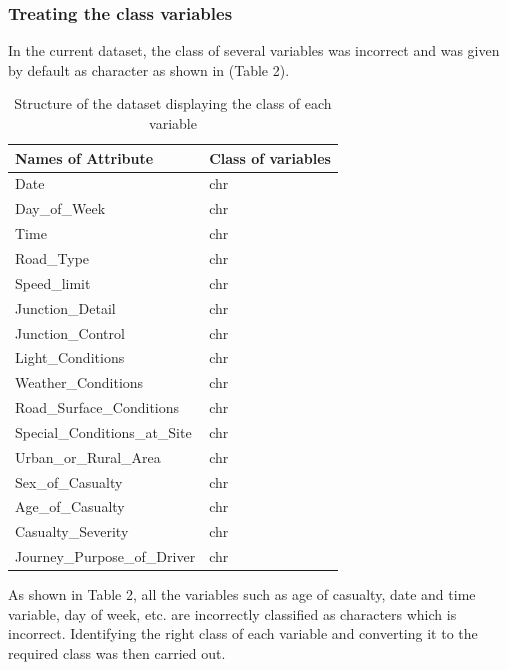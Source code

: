 \documentclass[
  a4paper,
]{article}
\begin{document}
\hypertarget{treating-the-class-variables}{%
\subsubsection{Treating the class
variables}\label{treating-the-class-variables}}

In the current dataset, the class of several variables was incorrect and
was given by default as character as shown in (Table 2).

\begin{table}[h]
\caption{Structure of the dataset displaying the class of each variable}
\bigskip
\centering
\begin{tabular}{l l}
\hline\hline
Names of Attribute & Class of variables\\ [0.75ex]
\hline
Date & chr  \\
Day\_of\_Week & chr \\
Time & chr \\
Road\_Type & chr \\
Speed\_limit & chr  \\
Junction\_Detail & chr \\
Junction\_Control & chr \\
Light\_Conditions  & chr\\
Weather\_Conditions   & chr\\
Road\_Surface\_Conditions  & chr\\
Special\_Conditions\_at\_Site  & chr\\
Urban\_or\_Rural\_Area  & chr\\ 
Sex\_of\_Casualty   & chr\\
Age\_of\_Casualty  & chr\\
Casualty\_Severity  & chr\\
Journey\_Purpose\_of\_Driver & chr \\ [1ex]
\hline
\end{tabular}
\label{tab:Table 2}
\end{table}

As shown in Table 2, all the variables such as age of casualty, date and
time variable, day of week, etc. are incorrectly classified as
characters which is incorrect. Identifying the right class of each
variable and converting it to the required class was then carried out.
\end{document}
